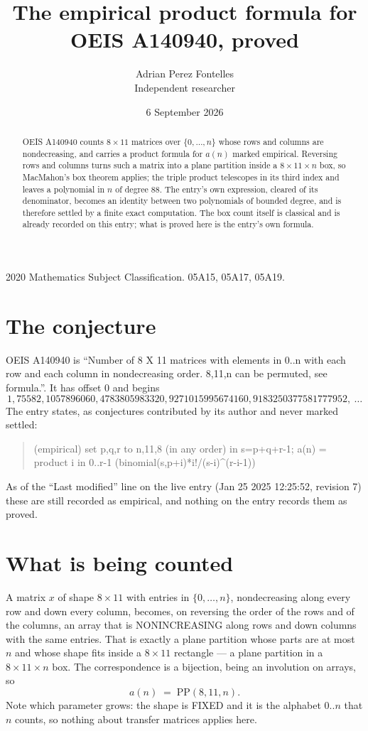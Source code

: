 \documentclass[11pt,a4paper]{article}
\title{The empirical product formula for OEIS A140940, proved}
\author{Adrian Perez Fontelles\\ \small Independent researcher}
\date{6 September 2026}
\theoremstyle{plain}
\theoremstyle{definition}
\begin{document}
\maketitle

\begin{abstract}
OEIS A140940 counts $8\times11$ matrices over $\{0,\dots,n\}$ whose rows and columns are
nondecreasing, and carries a product formula for $a(n)$ marked empirical. Reversing rows and
columns turns such a matrix into a plane partition inside a $8\times11\times n$ box, so
MacMahon's box theorem applies; the triple product telescopes in its third index and leaves a
polynomial in $n$ of degree $88$. The entry's own expression, cleared of its denominator,
becomes an identity between two polynomials of bounded degree, and is therefore settled by a
finite exact computation. The box count itself is classical and is already recorded on this
entry; what is proved here is the entry's own formula.
\end{abstract}

\noindent\small 2020 Mathematics Subject Classification. 05A15, 05A17, 05A19.\normalsize

\section{The conjecture}

OEIS A140940 is ``Number of 8 X 11 matrices with elements in 0..n with each row and each column in nondecreasing order. 8,11,n can be permuted, see formula.''. It has offset $0$ and begins
\[
1, 75582, 1057896060, 4783805983320, 9271015995674160, 9183250377581777952,\ \dots
\]
The entry states, as conjectures contributed by its author and never marked settled:
\begin{quote}
(empirical) set p,q,r to n,11,8 (in any order) in s=p+q+r-1; a(n) = product {i in 0..r-1} (binomial(s,p+i)*i!/(s-i)\^{}(r-i-1))

\end{quote}
As of the ``Last modified'' line on the live entry (Jan 25 2025 12:25:52, revision 7) these are still
recorded as empirical, and nothing on the entry records them as proved.

\section{What is being counted}

A matrix $x$ of shape $8\times11$ with entries in $\{0,\dots,n\}$, nondecreasing along
every row and down every column, becomes, on reversing the order of the rows and of the
columns, an array that is NONINCREASING along rows and down columns with the same entries. That
is exactly a plane partition whose parts are at most $n$ and whose shape fits inside a
$8\times11$ rectangle --- a plane partition in a $8\times11\times n$ box. The
correspondence is a bijection, being an involution on arrays, so
\[
a(n)\;=\;\mathrm{PP}(8,11,n).
\]
Note which parameter grows: the shape is FIXED and it is the alphabet $0..n$ that $n$ counts,
so nothing about transfer matrices applies here.
\end{document}
